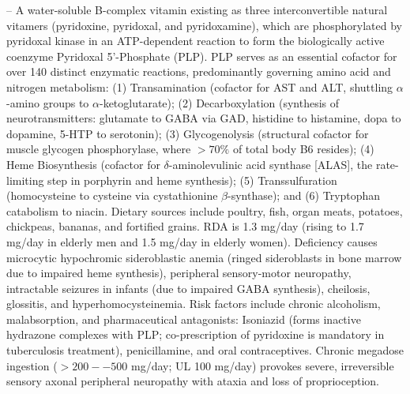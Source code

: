 -- A water-soluble B-complex vitamin existing as three interconvertible natural vitamers (pyridoxine, pyridoxal, and pyridoxamine), which are phosphorylated by pyridoxal kinase in an ATP-dependent reaction to form the biologically active coenzyme Pyridoxal 5'-Phosphate (PLP). PLP serves as an essential cofactor for over 140 distinct enzymatic reactions, predominantly governing amino acid and nitrogen metabolism: (1) Transamination (cofactor for AST and ALT, shuttling $\alpha$-amino groups to $\alpha$-ketoglutarate); (2) Decarboxylation (synthesis of neurotransmitters: glutamate to GABA via GAD, histidine to histamine, dopa to dopamine, 5-HTP to serotonin); (3) Glycogenolysis (structural cofactor for muscle glycogen phosphorylase, where $>70\%$ of total body B6 resides); (4) Heme Biosynthesis (cofactor for $\delta$-aminolevulinic acid synthase [ALAS], the rate-limiting step in porphyrin and heme synthesis); (5) Transsulfuration (homocysteine to cysteine via cystathionine $\beta$-synthase); and (6) Tryptophan catabolism to niacin. Dietary sources include poultry, fish, organ meats, potatoes, chickpeas, bananas, and fortified grains. RDA is 1.3 mg/day (rising to 1.7 mg/day in elderly men and 1.5 mg/day in elderly women). Deficiency causes microcytic hypochromic sideroblastic anemia (ringed sideroblasts in bone marrow due to impaired heme synthesis), peripheral sensory-motor neuropathy, intractable seizures in infants (due to impaired GABA synthesis), cheilosis, glossitis, and hyperhomocysteinemia. Risk factors include chronic alcoholism, malabsorption, and pharmaceutical antagonists: Isoniazid (forms inactive hydrazone complexes with PLP; co-prescription of pyridoxine is mandatory in tuberculosis treatment), penicillamine, and oral contraceptives. Chronic megadose ingestion ($>200--500$ mg/day; UL 100 mg/day) provokes severe, irreversible sensory axonal peripheral neuropathy with ataxia and loss of proprioception.

